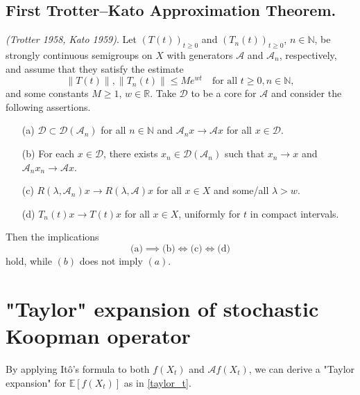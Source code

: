 \documentclass{article}[11]
\begin{document}
	
\subsection*{First Trotter--Kato Approximation Theorem.} 
\textit{(Trotter 1958, Kato 1959)}. Let $(T(t))_{t\geq0}$ and $(T_n(t))_{t\geq0}$, $n \in \mathbb{N}$, be strongly continuous semigroups on $X$ with generators $\mathcal{A}$ and $\mathcal{A}_n$, respectively, and assume that they satisfy the estimate
\[
\|T(t)\|, \|T_n(t)\| \leq Me^{wt} \quad \text{for all } t \geq 0, n \in \mathbb{N},
\]
and some constants $M \geq 1$, $w \in \mathbb{R}$. Take $\mathcal{D}$ to be a core for $\mathcal{A}$ and consider the following assertions.
\begin{itemize}
	\item[(a)] $\mathcal{D} \subset \mathcal{D}(\mathcal{A}_n)$ for all $n \in \mathbb{N}$ and $\mathcal{A}_n x \to \mathcal{A} x$ for all $x \in \mathcal{D}$.
	\item[(b)] For each $x \in \mathcal{D}$, there exists $x_n \in \mathcal{D}(\mathcal{A}_n)$ such that $x_n \to x$ and $\mathcal{A}_n x_n \to \mathcal{A} x$.
	\item[(c)] $R(\lambda, \mathcal{A}_n)x \to R(\lambda, \mathcal{A})x$ for all $x \in X$ and some/all $\lambda > w$.
	\item[(d)] $T_n(t)x \to T(t)x$ for all $x \in X$, uniformly for $t$ in compact intervals.
\end{itemize}
Then the implications
\[
\text{(a)} \implies \text{(b)} \iff \text{(c)} \iff \text{(d)}
\]
hold, while $(b)$ does not imply $(a)$.






\appendix
\newpage
\section{"Taylor" expansion of stochastic Koopman operator}\label{expansion_Ito_formula}
By applying It\^{o}'s formula to both \( f(X_t) \) and \( \mathcal{A} f(X_t) \), we can derive a "Taylor expansion" for \( \mathbb{E}[f(X_t)] \) as in \eqref{taylor_t}. 
\end{document}
